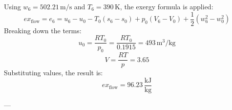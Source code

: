Using \( w_6 = 502.21 \, \text{m/s} \) and \( T_6 = 390 \, \text{K} \), the exergy formula is applied:  
\[
ex_{\text{flow}} = e_6 = u_6 - u_0 - T_0 (s_6 - s_0) + p_0 (V_6 - V_0) + \frac{1}{2} (w_6^2 - w_0^2)
\]  
Breaking down the terms:  
\[
u_0 = \frac{RT_0}{p_0} = \frac{RT_0}{0.1915} = 493 \, \text{m}^3/\text{kg}
\]  
\[
V = \frac{RT}{p} = 3.65
\]  
Substituting values, the result is:  
\[
ex_{\text{flow}} = 96.23 \, \frac{\text{kJ}}{\text{kg}}
\]  

---